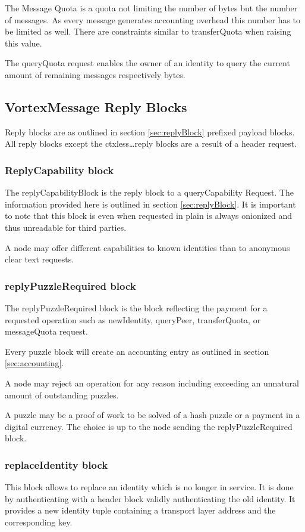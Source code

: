 The Message Quota is a quota not limiting the number of bytes but the number of messages. As every message generates accounting overhead this number has to be limited as well. There are constraints similar to transferQuota when raising this value.

The queryQuota request enables the owner of an identity to query the current amount of remaining messages respectively bytes.

\subsection{VortexMessage Reply Blocks}
Reply blocks are as outlined in section \ref{sec:replyBlock} prefixed payload blocks. All reply blocks except the ctxless\ldots reply blocks are a result of a header request.

\subsubsection{ReplyCapability block}
The replyCapabilityBlock is the reply block to a queryCapability Request. The information provided here is outlined in section \ref{sec:replyBlock}. It is important to note that this block is even when requested in plain is always onionized and thus unreadable for third parties. 

A node may offer different capabilities to known identities than to anonymous clear text requests.

\subsubsection{replyPuzzleRequired block}

The replyPuzzleRequired block is the block reflecting the payment for a requested operation such as newIdentity, queryPeer, transferQuota, or messageQuota request.

Every puzzle block will create an accounting entry as outlined in section \ref{sec:accounting}. 

A node may reject an operation for any reason including exceeding an unnatural amount of outstanding puzzles.

A puzzle may be a proof of work to be solved of a hash puzzle or a payment in a digital currency. The choice is up to the node sending the replyPuzzleRequired block.

\subsubsection{replaceIdentity block}
This block allows to replace an identity which is no longer in service. It  is done by authenticating with a header block validly authenticating the old identity. It provides a new identity tuple containing a transport layer address and the corresponding key.

